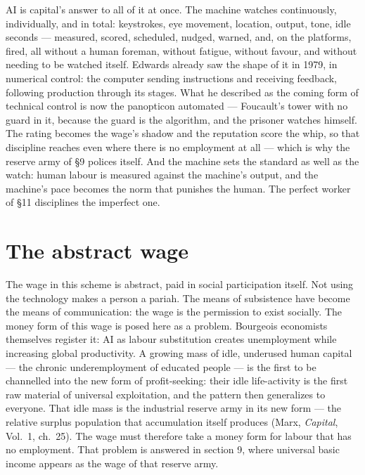 \documentclass[11pt]{article}
\begin{document}
AI is capital's answer to all of it at once. The machine watches
continuously, individually, and in total: keystrokes, eye movement,
location, output, tone, idle seconds --- measured, scored, scheduled,
nudged, warned, and, on the platforms, fired, all without a human
foreman, without fatigue, without favour, and without needing to be
watched itself. Edwards already saw the shape of it in 1979, in
numerical control: the computer sending instructions and receiving
feedback, following production through its stages. What he described as
the coming form of technical control is now the panopticon automated
--- Foucault's tower with no guard in it, because the guard is the
algorithm, and the prisoner watches himself. The rating becomes the
wage's shadow and the reputation score the whip, so that discipline
reaches even where there is no employment at all --- which is why the
reserve army of \S 9 polices itself. And the machine sets the standard
as well as the watch: human labour is measured against the machine's
output, and the machine's pace becomes the norm that punishes the
human. The perfect worker of \S 11 disciplines the imperfect one.

\section{The abstract wage}

The wage in this scheme is abstract, paid in social participation
itself. Not using the technology makes a person a pariah. The means of
subsistence have become the means of communication: the wage is the
permission to exist socially. The money form of this wage is posed here
as a problem. Bourgeois economists themselves register it: AI as labour
substitution creates unemployment while increasing global productivity.
A growing mass of idle, underused human capital --- the chronic
underemployment of educated people --- is the first to be channelled
into the new form of profit-seeking: their idle life-activity is the
first raw material of universal exploitation, and the pattern then
generalizes to everyone. That idle mass is the industrial reserve army
in its new form --- the relative surplus population that accumulation
itself produces (Marx, \textit{Capital}, Vol.~1, ch.~25). The wage must
therefore take a money form for labour that has no employment. That
problem is answered in section 9, where universal basic income appears
as the wage of that reserve army.
\end{document}
